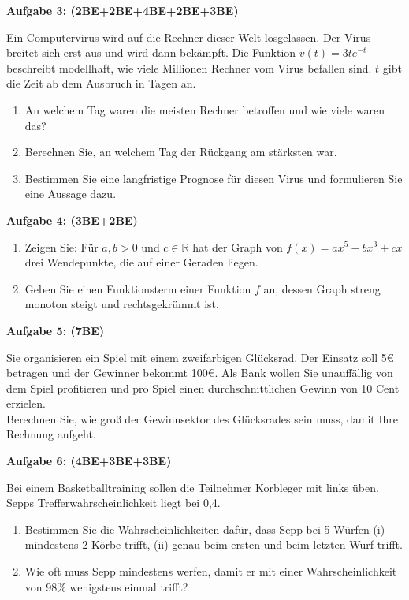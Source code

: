 \documentclass[a4paper,12pt]{article}
\newcommand{\Aufgabe}[1]{
  {
  \vspace*{0.5cm}
  \textsf{\textbf{Aufgabe #1}}
  \vspace*{0.2cm}
  
  }
}
\begin{document}
\Aufgabe{3: (2BE+2BE+4BE+2BE+3BE)} 
Ein Computervirus wird auf die Rechner dieser Welt losgelassen. Der Virus breitet sich erst aus und wird dann bekämpft. Die Funktion $v(t)=3t e^{-t}$  beschreibt modellhaft, wie viele Millionen Rechner vom Virus befallen sind. $t$ gibt die Zeit ab dem Ausbruch in Tagen an.
\begin{enumerate}[label={\alph*)}] 
  \item An welchem Tag waren die meisten Rechner betroffen und wie viele waren das?
  \item Berechnen Sie, an welchem Tag der Rückgang am stärksten war.
  \item Bestimmen Sie eine langfristige Prognose für diesen Virus und formulieren Sie eine Aussage dazu.
\end{enumerate}


\Aufgabe{4: (3BE+2BE)} 
\begin{enumerate}[label={\alph*)}] 
  \item Zeigen Sie: Für $a,b > 0$ und $c \in {\mathbb{R}}$  hat der Graph von $f(x)=ax^5-bx^3+cx$ drei Wendepunkte, die auf einer Geraden liegen.
\item Geben Sie einen Funktionsterm einer Funktion $f$ an, dessen Graph streng monoton steigt und rechtsgekrümmt ist.
\end{enumerate}


\Aufgabe{5: (7BE)} 
Sie organisieren ein Spiel mit einem zweifarbigen Glücksrad. Der Einsatz soll 5€ betragen und der Gewinner bekommt 100€. Als Bank wollen Sie unauffällig von dem Spiel profitieren und pro Spiel einen durchschnittlichen Gewinn von 10 Cent erzielen.\\
Berechnen Sie, wie groß der Gewinnsektor des Glücksrades sein muss, damit Ihre Rechnung aufgeht.

\Aufgabe{6: (4BE+3BE+3BE)} 
Bei einem Basketballtraining sollen die Teilnehmer Korbleger mit links üben. Sepps Trefferwahrscheinlichkeit liegt bei 0,4.
\begin{enumerate}[label={\alph*)}]
  \item Bestimmen Sie die Wahrscheinlichkeiten dafür, dass Sepp bei 5 Würfen (i) mindestens 2
    Körbe trifft, (ii) genau beim ersten und beim letzten Wurf trifft.
  \item Wie oft muss Sepp mindestens werfen, damit er mit einer Wahrscheinlichkeit von 98\%
    wenigstens einmal trifft?
\end{enumerate}




\end{document}
